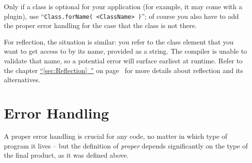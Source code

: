 \documentclass[11pt,a4paper, titlepage, parskip=half, headsepline, footsepline, cleardoublepage=current, headheight=1cm]{scrbook}
\newcommand*{\tqfullvref}[1]{\hyperref[{#1}]{“\ref*{#1}~\nameref*{#1}”} on page~\pageref{#1}}
\begin{document}
Only if a class is optional for your application (for example, it may come with a plugin), use “\lstinline|Class.forName( <ClassName> )|”; of course you also have to add the proper error handling for the case that the class is not there.

For reflection, the situation is similar: you refer to the class element that you want to get access to by its name, provided as a string. The compiler is unable to validate that name, so a potential error will surface earliest at runtime. Refer to the chapter \tqfullvref{sec:Reflection} for more details about reflection and its alternatives.


\section{Error Handling}\label{sec:ErrorHandling}
A proper error handling is crucial for any code, no matter in which type of program it lives – but the definition of \textit{proper} depends significantly on the type of the final product, as it was defined above.
\end{document}
